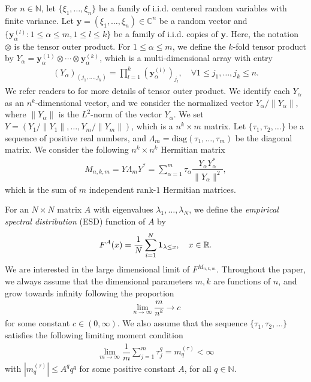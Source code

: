 \documentclass[12pt]{article}
\numberwithin{equation}{section} \theoremstyle{plain}
\def\bC{\mathbb C}
\def\bN{\mathbb N}
\def\bR{\mathbb R}
\def\y{\mathbf y}
\def\diag{\mathrm {diag}}
\begin{document}
For $n \in \bN$, let $\{\xi_1, \ldots, \xi_n\}$ be a family of i.i.d. centered random variables with finite variance. Let $\y = (\xi_1, \ldots, \xi_n) \in \bC^n$ be a random vector and $\{\y_{\alpha}^{(l)}: 1 \le \alpha \le m, 1 \le l \le k\}$ be a family of i.i.d. copies of $\y$.
Here, the notation $\otimes$ is the tensor outer product.
For $1 \le \alpha \le m$, we define the $k$-fold tensor product by $Y_{\alpha} = \y_{\alpha}^{(1)} \otimes \cdots \otimes \y_{\alpha}^{(k)}$, which is a multi-dimensional array with entry
\begin{align*}
    \left( Y_\alpha \right)_{(j_1,\ldots,j_k)} = \prod_{l=1}^k \left( \y_\alpha^{(l)} \right)_{j_l}, \quad
    \forall 1 \le j_1, \ldots, j_k \le n.
\end{align*}
We refer readers to \cite{Tensorbook2018} for more details of tensor outer product.
We identify each $Y_{\alpha}$ as an $n^k$-dimensional vector, and we consider the normalized vector $Y_\alpha/\|Y_\alpha\|$, where $\|Y_\alpha\|$ is the $L^2$-norm of the vector $Y_\alpha$. We set $Y = (Y_1/\|Y_1\|, \ldots, Y_m/\|Y_m\|)$, which is a $n^k \times m$ matrix. Let $\{\tau_1, \tau_2, \ldots\}$ be a sequence of positive real numbers, and $\Lambda_m = \diag(\tau_1,\ldots,\tau_m)$ be the diagonal matrix. We consider the following $n^k \times n^k$ Hermitian matrix
\begin{align}\label{eq-correlated matrix}
	M_{n,k,m} = Y \Lambda_m Y^*
    = \sum_{\alpha=1}^m \tau_{\alpha} \dfrac{Y_{\alpha} Y_{\alpha}^*}{\|Y_\alpha\|^2},
\end{align}
which is the sum of $m$ independent rank-$1$ Hermitian matrices.

For an $N \times N$ matrix $A$ with eigenvalues $\lambda_1,\ldots,\lambda_N$, we define the \emph{empirical spectral distribution} (ESD) function of $A$ by
\begin{align*}
    F^A(x) = \dfrac{1}{N} \sum_{i=1}^N {\bf 1}_{\lambda \le x}, \quad x \in \bR.
\end{align*}
We are interested in the large dimensional limit of $F^{M_{n,k,m}}$.
Throughout the paper, we always assume that the dimensional parameters $m,k$ are functions of $n$, and grow towards infinity following the proportion
\begin{align} \label{eq-def-ratio}
	\lim_{n \to \infty} \dfrac{m}{n^k} \to c
\end{align}
for some constant $c \in (0,\infty)$.
We also assume that the sequence $\{\tau_1,\tau_2,\ldots\}$ satisfies the following limiting moment condition
\begin{align} \label{eq-def-tau}
    \lim_{m \to \infty} \dfrac{1}{m} \sum_{j=1}^m \tau_j^q = m_q^{(\tau)} < \infty
\end{align}
with $|m_q^{{(\tau)}}| \le A^qq^q$ for some positive constant $A$, for all $q \in \bN$.
\end{document}
